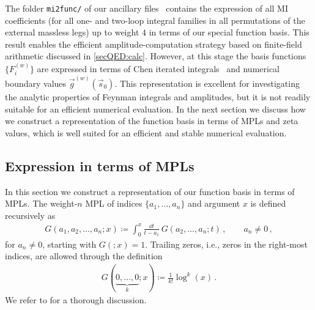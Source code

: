 \documentclass[main.tex]{subfiles}
\begin{document}
The folder \texttt{mi2func/} of our ancillary files~\cite{zenodo} contains the expression of all \ac{MI} coefficients (for all one- and two-loop integral families in all permutations of the external massless legs) up to weight $4$ in terms of our special function basis. This result enables the efficient amplitude-computation strategy based on finite-field arithmetic discussed in \cref{secQED:calc}.
However, at this stage the basis functions $\{F^{(w)}_i\}$ are expressed in terms of Chen iterated integrals~\cite{Chen:1977oja} and numerical boundary values $\vec{g}^{(w)}(\vec{s}_0)$. This representation is excellent for investigating the analytic properties of Feynman integrals and amplitudes, but it is not readily suitable for an efficient numerical evaluation.
In the next section we discuss how we construct a representation of the function basis in terms of \acp{MPL} and zeta values, which is well suited for an efficient and stable numerical evaluation.


\subsection{Expression in terms of \aclp{MPL}}
\label{secQED:basis_MPLs}

In this section we construct a representation of our function basis in terms of \acp{MPL}. The weight-$n$ \ac{MPL} of indices $\{a_1,\ldots,a_n\}$ and argument $x$ is defined recursively as
\begin{align} 
G(a_1,a_2,\ldots,a_n; x) \coloneqq \int_0^x \frac{\dd t}{t - a_1} \, G(a_2,\ldots,a_n; t) \,, \qquad a_n \neq 0 \,, 
\end{align}
for $a_n \neq 0$, starting with $G(;x) = 1$. Trailing zeros, i.e., zeros in the right-most indices, are allowed through the definition
\begin{align} \label{eqQED:trailingzeros}
G(\underbrace{0,\ldots,0}_{k}; x) \coloneqq \frac{1}{k!} \log^k(x) \,.
\end{align}
We refer to  for a thorough discussion.
\end{document}
